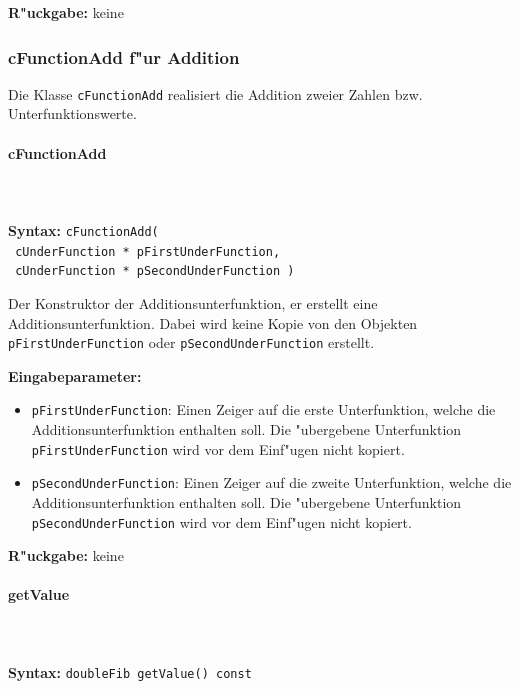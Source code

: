 \bigskip\noindent
\textbf{R"uckgabe:} keine


\subsubsection{cFunctionAdd f"ur Addition}

Die Klasse \verb|cFunctionAdd| realisiert die Addition zweier Zahlen bzw. Unterfunktionswerte.

\paragraph{cFunctionAdd}

\ \\\\\noindent
\textbf{Syntax:} \verb|cFunctionAdd(| \\\verb| cUnderFunction * pFirstUnderFunction,| \\\verb| cUnderFunction * pSecondUnderFunction )|

\bigskip\noindent
Der Konstruktor der Additionsunterfunktion, er erstellt eine Additionsunterfunktion. Dabei wird keine Kopie von den Objekten \verb|pFirstUnderFunction| oder \verb|pSecondUnderFunction| erstellt.

\bigskip\noindent
\textbf{Eingabeparameter:}
\begin{itemize}
 \item \verb|pFirstUnderFunction|:  Einen Zeiger auf die erste Unterfunktion, welche die Additionsunterfunktion enthalten soll. Die "ubergebene Unterfunktion \verb|pFirstUnderFunction| wird vor dem Einf"ugen nicht kopiert.
 \item \verb|pSecondUnderFunction|: Einen Zeiger auf die zweite Unterfunktion, welche die Additionsunterfunktion enthalten soll. Die "ubergebene Unterfunktion \verb|pSecondUnderFunction| wird vor dem Einf"ugen nicht kopiert.
\end{itemize}

\bigskip\noindent
\textbf{R"uckgabe:} keine


\paragraph{getValue}

\ \\\\\noindent
\textbf{Syntax:} \verb|doubleFib getValue() const|

